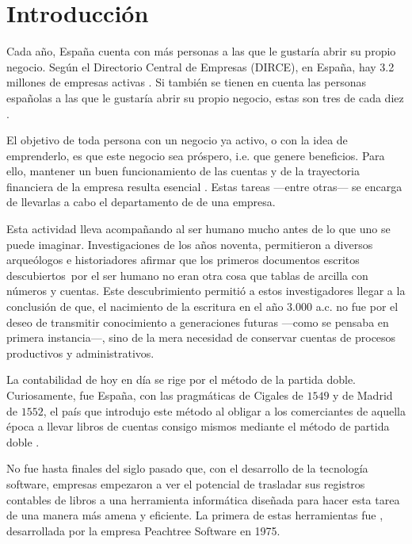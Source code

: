 \pagestyle{plain}

\section{Introducción}
Cada año, España cuenta con más personas a las que le gustaría abrir su propio negocio. Según el Directorio Central de Empresas (DIRCE), en España, hay 3.2 millones de empresas activas \parencite{ine}. Si también se tienen en cuenta las personas españolas a las que le gustaría abrir su propio negocio, estas son tres de cada diez \parencite{CEAJE}.

El objetivo de toda persona con un negocio ya activo, o con la idea de emprenderlo, es que este negocio sea próspero, i.e. que genere beneficios. Para ello, mantener un buen funcionamiento de las cuentas y de la trayectoria financiera de la empresa resulta esencial \parencite{importanciaContabilidad}. Estas tareas ---entre otras--- se encarga de llevarlas a cabo el departamento de   de una empresa. 

Esta actividad \parencite{historiaContabilidad} lleva acompañando al ser humano mucho antes de lo que uno se puede imaginar. Investigaciones de los años noventa, permitieron a diversos arqueólogos e historiadores afirmar que los primeros documentos escritos descubiertos\fnm\ por el ser humano no eran otra cosa que tablas de arcilla con números y cuentas. Este descubrimiento permitió a estos investigadores llegar a la conclusión de que, el nacimiento de la escritura en el año $3.000$ a.c. no fue por el deseo de transmitir conocimiento a generaciones futuras ---como se pensaba en primera instancia---, sino de la mera necesidad de conservar cuentas de procesos productivos y administrativos.

La contabilidad de hoy en día se rige por el método de la partida doble\fnm. Curiosamente, fue España, con las pragmáticas de Cigales de $1549$ y de Madrid de $1552$, el país que introdujo este método al obligar a los comerciantes de aquella época a llevar libros de cuentas consigo mismos mediante el método de partida doble \parencite{icac}.

No fue hasta finales del siglo pasado que, con el desarrollo de la tecnología software, empresas empezaron a ver el potencial de trasladar sus registros contables de libros a una herramienta informática diseñada para hacer esta tarea de una manera más amena y eficiente. La primera de estas herramientas fue , desarrollada por la empresa Peachtree Software en 1975.

